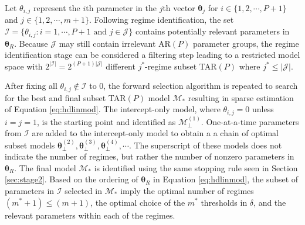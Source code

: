 Let $\theta_{i,j}$ represent the $i$th parameter in the $j$th vector $\bm{\theta}_j$ for $i\in \{1,2, \cdots, P+1\}$ and $j\in \{1,2,\cdots,m+1\}$. Following regime identification, the set $\mathcal{I}=\{\theta_{i,j}:i=1,\cdots,P+1 \textrm{ and } j\in\mathcal{J}\}$ contains potentially relevant parameters in $\bm{\theta}_R$. Because $\mathcal{J}$ may still contain irrelevant AR$(P)$ parameter groups, the regime identification stage can be considered a filtering step leading to a restricted model space with $2^{|\mathcal{I}|}=2^{(P+1)|\mathcal{J}|}$ different $j^*$-regime subset TAR$(P)$ where $j^*\leq |\mathcal{J}|$.

After fixing all $\theta_{i,j} \notin \mathcal{I}$ to $0$, the forward selection algorithm is repeated to search for the best and final subset TAR$(P)$ model $\mathcal{M}_*$ resulting in sparse estimation of Equation \ref{eq:hdlinmod}. The intercept-only model, where $\theta_{i,j}=0$ unless $i=j=1$, is the starting point and identified as $\mathcal{M}^{(1)}_\perp$. One-at-a-time parameters from $\mathcal{I}$ are added to the intercept-only model to obtain a a chain of optimal subset models $\bm{\theta}^{(2)}_\perp, \bm{\theta}^{(3)}_\perp, \bm{\theta}^{(4)}_\perp, \cdots$. The superscript of these models does not indicate the number of regimes, but rather the number of nonzero parameters in $\bm{\theta}_R$. The final model $\mathcal{M}_*$ is identified using the same stopping rule seen in Section \ref{sec:stage2}. Based on the ordering of $\bm{\theta}_R$ in Equation \ref{eq:hdlinmod}, the subset of parameters in $\mathcal{I}$ selected in $\mathcal{M}_*$ imply the optimal number of regimes $(m^*+1) \leq (m+1)$, the optimal choice of the $m^*$ thresholds in $\delta$, and the relevant parameters within each of the regimes.








